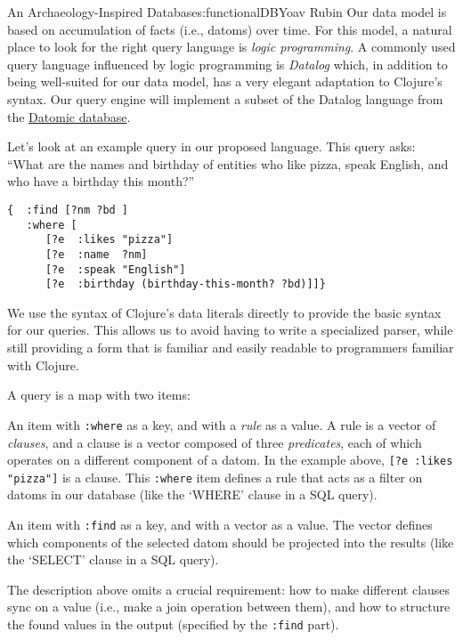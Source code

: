 \begin{aosachapter}{An Archaeology-Inspired Database}{s:functionalDB}{Yoav Rubin}
Our data model is based on accumulation of facts (i.e., datoms) over
time. For this model, a natural place to look for the right query
language is \emph{logic programming}. A commonly used query language
influenced by logic programming is \emph{Datalog} which, in addition to
being well-suited for our data model, has a very elegant adaptation to
Clojure's syntax. Our query engine will implement a subset of the
Datalog language from the
\href{http://docs.datomic.com/query.html}{Datomic database}.

\label{query-language}

Let's look at an example query in our proposed language. This query
asks: ``What are the names and birthday of entities who like pizza,
speak English, and who have a birthday this month?''

\begin{verbatim}
{  :find [?nm ?bd ]
   :where [
      [?e  :likes "pizza"]
      [?e  :name  ?nm] 
      [?e  :speak "English"]
      [?e  :birthday (birthday-this-month? ?bd)]]}
\end{verbatim}

\label{syntax}

We use the syntax of Clojure's data literals directly to provide the
basic syntax for our queries. This allows us to avoid having to write a
specialized parser, while still providing a form that is familiar and
easily readable to programmers familiar with Clojure.

A query is a map with two items:

\begin{aosaitemize}

\item
  An item with \texttt{:where} as a key, and with a \emph{rule} as a
  value. A rule is a vector of \emph{clauses}, and a clause is a vector
  composed of three \emph{predicates}, each of which operates on a
  different component of a datom. In the example above,
  \texttt{{[}?e  :likes "pizza"{]}} is a clause. This \texttt{:where}
  item defines a rule that acts as a filter on datoms in our database
  (like the `WHERE' clause in a SQL query).
\item
  An item with \texttt{:find} as a key, and with a vector as a value.
  The vector defines which components of the selected datom should be
  projected into the results (like the `SELECT' clause in a SQL query).
\end{aosaitemize}

The description above omits a crucial requirement: how to make different
clauses sync on a value (i.e., make a join operation between them), and
how to structure the found values in the output (specified by the
\texttt{:find} part).


\end{aosachapter}

